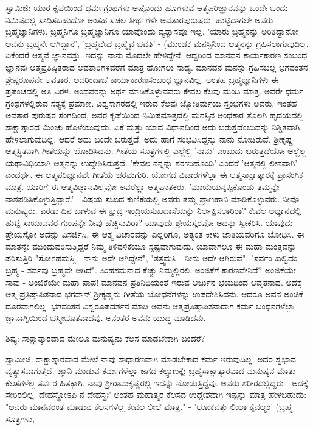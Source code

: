 ಸ್ವಾಮಿಜಿ: ಯಾರ ಕೃಪೆಯಿಂದ ಧರ್ಮಗ್ರಂಥಗಳು ಅಷ್ಟೊಂದು ಹೊಗಳುವ ಆತ್ಮಪರಿಜ್ಞಾನವನ್ನು ಒಂದೇ ಒಂದು ನಿಮಿಷದಲ್ಲಿ ಸಾಧಿಸಬಹುದೋ ಅಂತಹ ಸಚಲ ತೀರ್ಥಗಳೇ ಅವತಾರಪುರುಷರು. ಹುಟ್ಟಿದಾಗಲೇ ಅವರು ಬ್ರಹ್ಮಜ್ಞಾನಿಗಳು. ಬ್ರಹ್ಮನಿಗೂ ಬ್ರಹ್ಮಜ್ಞಾನಿಗೂ ಯಾವೊಂದು ವ್ಯತ್ಯಾಸವೂ ಇಲ್ಲ. 'ಯಾರು ಬ್ರಹ್ಮನನ್ನು ಅರಿತಿದ್ದಾನೋ ಅವನು ಬ್ರಹ್ಮನೇ ಆಗಿದ್ದಾನೆ', 'ಬ್ರಹ್ಮವೇದ ಬ್ರಹ್ಮೈವ ಭವತಿ' - (ಮುಂಡಕ  ಮನಸ್ಸಿನಿಂದ ಆತ್ಮನನ್ನು ಗ್ರಹಿಸಲಾಗುವುದಿಲ್ಲ. ಏಕೆಂದರೆ ಆತ್ಮವೆ ಜ್ಞಾನವಸ್ತು. ಇದನ್ನು ನಾನು ಮೊದಲೇ ಹೇಳಿದ್ದೇನೆ. ಆದ್ದರಿಂದ ಮಾನವನ ಕಾರ್ಯಕಾರಣ ಸಂಬಂಧ ಜ್ಞಾನವು ಆತ್ಮಪ್ರತಿಷ್ಠಿತರಾದ ಅವತಾರಿಗಳವರೆಗೆ ಮಾತ್ರ ಹೋಗಲು ಸಾಧ್ಯ. ಮಾನವನ ಮನಸ್ಸು ಗ್ರಹಿಸಬಲ್ಲ ಭಗವಂತನ ಶ್ರೇಷ್ಠರೂಪವೇ ಅವತಾರ. ಅದರಿಂದಾಚೆ ಕಾರ್ಯಕಾರಣಸಂಬಂಧ ಜ್ಞಾನವಿಲ್ಲ. ಅಂತಹ ಬ್ರಹ್ಮಜ್ಞಾನಿಗಳು ಈ ಪ್ರಪಂಚದಲ್ಲಿ ಅತಿ ವಿರಳ. ಅಂಥವರನ್ನು ಅರ್ಥ ಮಾಡಿಕೊಳ್ಳುವವರು ಕೇವಲ ಕೆಲವು ಮಂದಿ ಮಾತ್ರ. ಅವರೇ ಧರ್ಮ ಗ್ರಂಥಗಳಲ್ಲಿರುವ ಸತ್ಯಕ್ಕೆ ಪ್ರಮಾಣ. ವಿಶ್ವಸಾಗರದಲ್ಲಿ ಇರುವ ಕೆಲವು ಜ್ಯೋತಿರ್ಮಯ ಸ್ತಂಭಗಳು ಅವರು. ಇಂತಹ ಅವತಾರ ಪುರುಷರ ಸಂಗದಿಂದ, ಅವರ ಕೃಪೆಯಿಂದ ನಿಮಿಷಮಾತ್ರದಲ್ಲಿ ಮನಸ್ಸಿನ ಅಂಧಕಾರ ತೊಲಗಿ ಹೃದಯದಲ್ಲಿ ಸಾಕ್ಷಾತ್ಕಾರದ ಮಿಂಚು ಹೊಳೆಯುವುದು. ಏಕೆ ಮತ್ತು ಯಾವ ವಿಧಾನದಿಂದ ಅದು ಬರುತ್ತದೆಂಬುದನ್ನು ನಿಶ್ಚಿತವಾಗಿ ಹೇಳಲಾಗುವುದಿಲ್ಲ. ಆದರೆ ಅದು ಬಂದೇ ಬರುತ್ತದೆ. ಅದು ಹಾಗೆ ಸಂಭವಿಸಿದ್ದನ್ನು ನಾನು ನೋಡಿರುವೆ. ಶ‍್ರೀಕೃಷ್ಣ ಆತ್ಮಸ್ಥಿತನಾಗಿ ಗೀತೆಯನ್ನು ಬೋಧಿಸಿದನು. ಗೀತೆಯ ಸೂತ್ರಗಳಲ್ಲಿ ಎಲ್ಲೆಲ್ಲಿ 'ನಾನು' ಎಂಬುದು ಬರುತ್ತದೆಯೋ ಅಲ್ಲೆಲ್ಲ ಯಥಾವಿಧಿಯಾಗಿ ಆತ್ಮನನ್ನು ಉದ್ದೇಶಿಸಿರುತ್ತದೆ. 'ಕೇವಲ ನನ್ನನ್ನು ಶರಣುಹೊಂದಿ' ಎಂದರೆ 'ಆತ್ಮನಲ್ಲಿ ಲೀನವಾಗಿ' ಎಂದರ್ಥ. ಈ ಆತ್ಮಪರಿಜ್ಞಾನವೇ ಗೀತೆಯ ಚರಮಗುರಿ. ಯೋಗದ ವಿಚಾರಗಳೆಲ್ಲಾ ಈ ಆತ್ಮಸಾಕ್ಷಾತ್ಕಾರಕ್ಕೆ ಪ್ರಾಸಂಗಿಕ ಮಾತ್ರ. ಯಾರಿಗೆ ಈ ಆತ್ಮವಿಜ್ಞಾನವಿಲ್ಲವೋ ಅವರೆಲ್ಲಾ ಆತ್ಮಘಾತಕರು. 'ಮಾಯೆಯನ್ನಪ್ಪಿಕೊಂಡು ತಮ್ಮನ್ನೇ ನಾಶಪಡಿಸಿಕೊಳ್ಳುತ್ತಿದ್ದಾರೆ.' - ವಿಷಯ ಸುಖದ ಕುಣಿಕೆಯಲ್ಲಿ ಅವರು ತಮ್ಮ ಪ್ರಾಣಹಾನಿ ಮಾಡಿಕೊಳ್ಳುವರು. ನೀವೂ ಮನುಷ್ಯರು. ಎರಡು ದಿನ ಬಾಳುವ ಈ ಕ್ಷುದ್ರ ಇಂದ್ರಿಯಸುಖದಾಸೆಯನ್ನು ನಿರ್ಲಕ್ಷಿಸಲಾರಿರಾ? ಕೇವಲ ಅಜ್ಞಾನದಲ್ಲಿ ಹುಟ್ಟಿ ಸಾಯುವವರ ಗುಂಪನ್ನೇ ನೀವು ಹೆಚ್ಚಿಸುವಿರಾ? ಯಾವುದು ಶ್ರೇಯಸ್ಕರವೋ ಅದನ್ನು ಸ್ವೀಕರಿಸಿ. ಯಾವುದು ಪ್ರೇಯಸ್ಸೋ ಅದನ್ನು ವಿಸರ್ಜಿಸಿ. ಈ ಆತ್ಮ ವಿಚಾರವನ್ನು ಎಲ್ಲರಿಗೂ, ಅತ್ಯಂತ ಕೀಳು ಜಾತಿಯವರಿಗೂ ಬೋಧಿಸಿ. ಈ ಮಾತನ್ನೇ ಮುಂದುವರಿಸುತ್ತಿದ್ದರೆ ನಿಮ್ಮ ತಿಳಿವಳಿಕೆಯೂ ಸ್ಪಷ್ಟವಾಗುವುದು. ಯಾವಾಗಲೂ ಈ ಮಹಾ ಮಂತ್ರವನ್ನು ಪಠಿಸುತ್ತಿರಿ "ಸೋಽಹಮಸ್ಮಿ - ನಾನು ಅದೇ ಆಗಿದ್ದೇನೆ", "ತತ್ತ್ವಮಸಿ - ನೀನು ಅದೇ ಆಗಿರುವೆ", "ಸರ್ವಂ ಖಲ್ವಿದಂ ಬ್ರಹ್ಮ - ಸರ್ವವು ಬ್ರಹ್ಮವೇ ಆಗಿದೆ". ಸಿಂಹಸಮನಾದ ಕೆಚ್ಚು ನಿಮ್ಮಲ್ಲಿರಲಿ. ಅಂಜಿಕೆಗೆ ಕಾರಣವೇನಿದೆ? ಅಂಜಿಕೆಯೇ ಸಾವು - ಅಂಜಿಕೆಯೇ ಮಹಾ ಪಾಪ! ಮಾನವನ ಪ್ರತಿನಿಧಿಯಂತೆ ಇರುವ ಅರ್ಜುನ ಭಯದಿಂದ ಆವೃತನಾದ. ಅದಕ್ಕೆ ಆತ್ಮ ಪ್ರತಿಷ್ಠಾಪಿತನಾದ ಭಗವಾನ್ ಶ‍್ರೀಕೃಷ್ಣನು ಗೀತೆಯ ಬೋಧನೆಗಳನ್ನು ಉಪದೇಶಿಸಿದನು. ಆದರೂ ಅವನ ಅಂಜಿಕೆ ದೂರವಾಗಲಿಲ್ಲ. ಭಗವಂತನ ವಿಶ್ವರೂಪದರ್ಶನ ಮಾಡಿ ಅವನು ಆತ್ಮಪ್ರತಿಷ್ಠಾಪಿತನಾದಾಗ ಕರ್ಮ ಬಂಧನಗಳೆಲ್ಲಾ ಜ್ಞಾನಾಗ್ನಿಯಿಂದ ಭಸ್ಮೀಭೂತವಾದವು. ಅನಂತರ ಅವನು ಯುದ್ಧ ಮಾಡಿದನು.

ಶಿಷ್ಯ: ಸಾಕ್ಷಾತ್ಕಾರವಾದ ಮೇಲೂ ಮನುಷ್ಯನು ಕೆಲಸ ಮಾಡಬೇಕಾಗಿ ಬಂದರೆ?

ಸ್ವಾಮೀಜಿ: ಸಾಕ್ಷಾತ್ಕಾರವಾದ ಮೇಲೆ ನಾವು ಸಾಧಾರಣವಾಗಿ ಮಾಡಬೇಕಾದ ಕರ್ಮ ಇರುವುದಿಲ್ಲ. ಅದರ ಸ್ವಭಾವ ವ್ಯತ್ಯಾಸವಾಗುತ್ತದೆ. ಜ್ಞಾನಿ ಮಾಡುವ ಕರ್ಮಗಳೆಲ್ಲಾ ಜಗದ ಕಲ್ಯಾಣಕ್ಕೆ; ಬ್ರಹ್ಮಸಾಕ್ಷಾತ್ಕಾರವಾದ ಮನುಷ್ಯನ ಮಾತು ಕೆಲಸಗಳೆಲ್ಲ ಸರ್ವರ ಹಿತಕ್ಕಾಗಿ. ನಾವು ಶ‍್ರೀರಾಮಕೃಷ್ಣರಲ್ಲಿ ಇದನ್ನು ನೋಡುತ್ತಿದ್ದೆವು. ಅವರು ಶರೀರದಲ್ಲಿದ್ದರು - ಅದಕ್ಕೆ ಸೇರಿರಲಿಲ್ಲ. ದೇಹಸ್ಥೋಽಪಿ ನ ದೇಹಸ್ಥಃ' ಅಂತಹ ಮಹಾತ್ಮರ ಕೆಲಸದ ಉದ್ದೇಶವಾಗಿ ಇಷ್ಟನ್ನು ಮಾತ್ರ ಹೇಳಬಹುದು: "ಅವರು ಮಾನವರಂತೆ ಮಾಡುವ ಕೆಲಸಗಳೆಲ್ಲ ಕೇವಲ ಲೀಲೆ ಮಾತ್ರ." - 'ಲೋಕವತ್ತು ಲೀಲಾ ಕೈವಲ್ಯಂ' (ಬ್ರಹ್ಮ ಸೂತ್ರಗಳು, 

